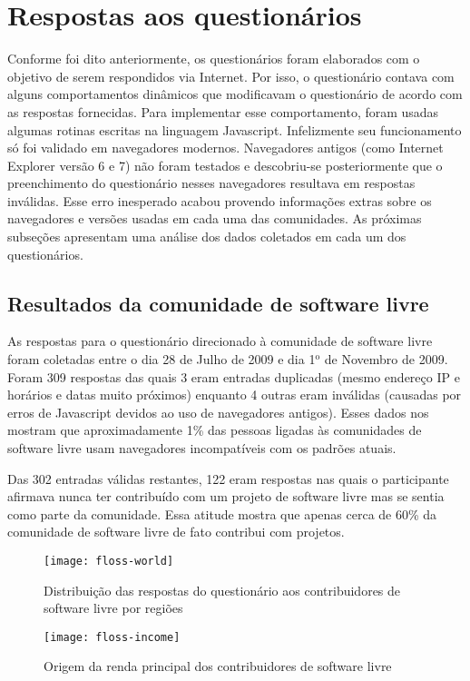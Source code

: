 \section{Respostas aos questionários}
\label{sec:respostas}

Conforme foi dito anteriormente, os questionários foram elaborados com
o objetivo de serem respondidos via Internet. Por isso, o questionário
contava com alguns comportamentos dinâmicos que modificavam o
questionário de acordo com as respostas fornecidas. Para implementar
esse comportamento, foram usadas algumas rotinas escritas na linguagem
Javascript. Infelizmente seu funcionamento só foi validado em
navegadores modernos. Navegadores antigos (como Internet Explorer
versão 6 e 7) não foram testados e descobriu-se posteriormente que o
preenchimento do questionário nesses navegadores resultava em
respostas inválidas. Esse erro inesperado acabou provendo informações
extras sobre os navegadores e versões usadas em cada uma das
comunidades. As próximas subseções apresentam uma análise dos dados
coletados em cada um dos questionários.

\subsection{Resultados da comunidade de software livre}
\label{sec:resp-floss}

As respostas para o questionário direcionado à comunidade de software
livre foram coletadas entre o dia 28 de Julho de 2009 e dia
1$^{\textrm{o}}$ de Novembro de 2009. Foram 309 respostas das quais 3
eram entradas duplicadas (mesmo endereço IP e horários e datas muito
próximos) enquanto 4 outras eram inválidas (causadas por erros de
Javascript devidos ao uso de navegadores antigos). Esses dados nos
mostram que aproximadamente 1\% das pessoas ligadas às comunidades de
software livre usam navegadores incompatíveis com os padrões atuais.

Das 302 entradas válidas restantes, 122 eram respostas nas quais o
participante afirmava nunca ter contribuído com um projeto de software
livre mas se sentia como parte da comunidade. Essa atitude mostra que
apenas cerca de 60\% da comunidade de software livre de fato contribui
com projetos.

\begin{figure}[htb]
  \begin{minipage}[t]{0.5\linewidth}
    \centering
    \texttt{[image: floss-world]}
    \caption{Distribuição das respostas do questionário aos
      contribuidores de software livre por regiões}
    \label{fig:floss-world}
  \end{minipage}
  \begin{minipage}[t]{0.5\linewidth}
    \centering
    \texttt{[image: floss-income]}
    \caption{Origem da renda principal dos contribuidores de software
      livre}
    \label{fig:floss-income}
  \end{minipage}
\end{figure}

